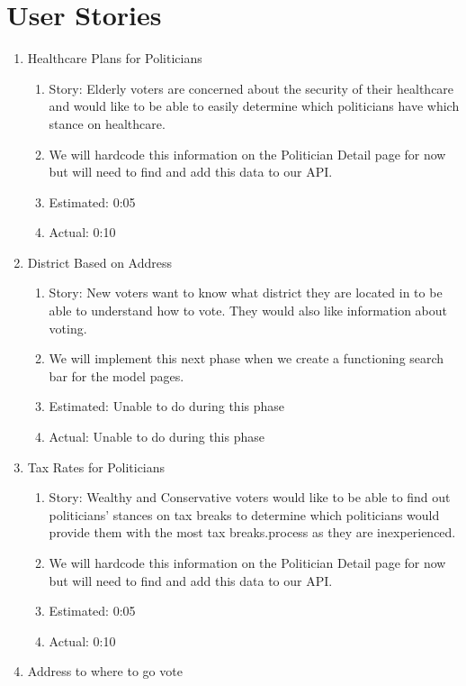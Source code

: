 \documentclass[11t]{article}
\begin{document}
\section{User Stories}
\begin{enumerate}
    \item Healthcare Plans for Politicians
    \begin{enumerate}
        \item Story: Elderly voters are concerned about the security of their healthcare and would like to be able to easily determine which politicians have which stance on healthcare.
        \item We will hardcode this information on the Politician Detail page for now but will need to find and add this data to our API. 
        \item Estimated: 0:05
        \item Actual: 0:10
    \end{enumerate}
    \item District Based on Address
    \begin{enumerate}
        \item Story: New voters want to know what district they are located in to be able to understand how to vote. They would also like information about voting. 
        \item We will implement this next phase when we create a functioning search bar for the model pages.
        \item Estimated: Unable to do during this phase
        \item Actual: Unable to do during this phase
    \end{enumerate}
    \item Tax Rates for Politicians
    \begin{enumerate}
        \item Story: Wealthy and Conservative voters would like to be able to find out politicians’ stances on tax breaks to determine which politicians would provide them with the most tax breaks.process as they are inexperienced.
        \item We will hardcode this information on the Politician Detail page for now but will need to find and add this data to our API. 
        \item Estimated: 0:05
        \item Actual: 0:10
    \end{enumerate}
    \item Address to where to go vote
    \begin{enumerate}

\end{enumerate}
\end{enumerate}
\end{document}
